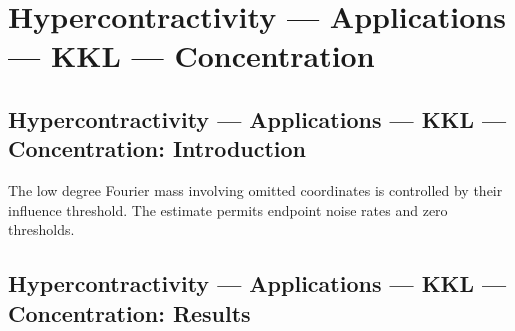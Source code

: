 \section{Hypercontractivity --- Applications --- KKL --- Concentration}
\subsection*{Hypercontractivity --- Applications --- KKL --- Concentration: Introduction}
The low degree Fourier mass involving omitted coordinates is controlled by their influence threshold. The estimate permits endpoint noise rates and zero thresholds.

\subsection*{Hypercontractivity --- Applications --- KKL --- Concentration: Results}


